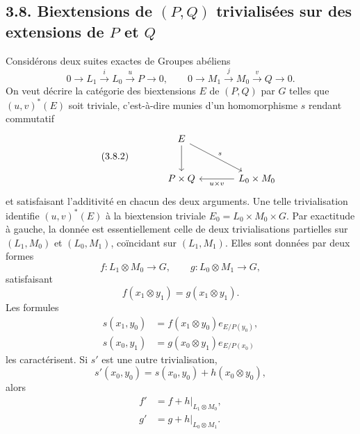 \documentclass[11pt]{article}
\begin{document}
\subsection*{3.8. Biextensions de \((P,Q)\) trivialisées sur des extensions de \(P\) et \(Q\)}

Considérons deux suites exactes de Groupes abéliens
\begin{equation}\tag{3.8.1}
        0\to L_1\xrightarrow{i}L_0\xrightarrow{u}P\to0,
        \qquad
        0\to M_1\xrightarrow{j}M_0\xrightarrow{v}Q\to0.
\end{equation}
On veut décrire la catégorie des biextensions \(E\) de \((P,Q)\) par \(G\) telles que \((u,v)^*(E)\) soit triviale, c'est-à-dire munies d'un homomorphisme \(s\) rendant commutatif
\begin{equation}\tag{3.8.2}
\begin{tikzcd}[column sep=large,row sep=large]
& E \arrow[d] \arrow[dr,"s"]&\\
& P\times Q & L_0\times M_0 \arrow[l,"u\times v"]
\end{tikzcd}
\end{equation}
et satisfaisant l'additivité en chacun des deux arguments.  Une telle trivialisation identifie \((u,v)^*(E)\) à la biextension triviale \(E_0=L_0\times M_0\times G\).  Par exactitude à gauche, la donnée est essentiellement celle de deux trivialisations partielles sur \((L_1,M_0)\) et \((L_0,M_1)\), coïncidant sur \((L_1,M_1)\).  Elles sont données par deux formes
\begin{equation}\tag{3.8.3}
        f:L_1\otimes M_0\to G,
        \qquad
        g:L_0\otimes M_1\to G,
\end{equation}
satisfaisant
\begin{equation}\tag{3.8.4}
        f(x_1\otimes y_1)=g(x_1\otimes y_1).
\end{equation}
Les formules
\begin{equation}\tag{3.8.5}
\begin{aligned}
 s(x_1,y_0)&=f(x_1\otimes y_0)e_{E/P(y_0)},\\
 s(x_0,y_1)&=g(x_0\otimes y_1)e_{E/P(x_0)}
\end{aligned}
\end{equation}
les caractérisent.  Si \(s'\) est une autre trivialisation,
\begin{equation}\tag{3.8.6}
        s'(x_0,y_0)=s(x_0,y_0)+h(x_0\otimes y_0),
\end{equation}
alors
\begin{equation}\tag{3.8.7}
\begin{aligned}
 f'&=f+h|_{L_1\otimes M_0},\\
 g'&=g+h|_{L_0\otimes M_1}.
\end{aligned}
\end{equation}
\end{document}
